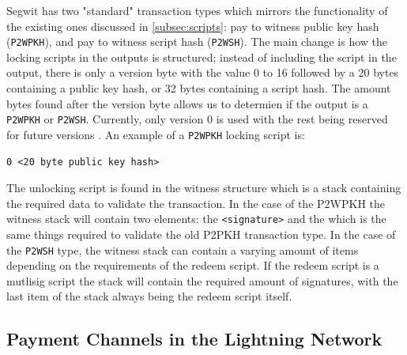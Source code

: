 Segwit has two "standard" transaction types which mirrors the functionality of the existing ones discussed in \cref{subsec:scripts}: pay to witness public key hash ({\tt P2WPKH}), and pay to witness script hash ({\tt P2WSH}). The main change is how the locking scripts in the outputs is structured; instead of including the script in the output, there is only a version byte with the value 0 to 16 followed by a 20 bytes containing a public key hash, or 32 bytes containing a script hash. The amount bytes found after the version byte allows us to determien if the output is a {\tt P2WPKH} or {\tt P2WSH}. Currently, only version 0 is used with the rest being reserved for future versions \cite{BIP141}. An example of a {\tt P2WPKH} locking script is:

\begin{verbatim}
0 <20 byte public key hash>
\end{verbatim}

The unlocking script is found in the witness structure which is a stack containing the required data to validate the transaction.
In the case of the P2WPKH the witness stack will contain two elements: the {\tt <signature>} and the {\tt <public key>} which is the same things required to validate the old P2PKH transaction type. In the case of the {\tt P2WSH} type, the witness stack can contain a varying amount of items depending on the requirements of the redeem script. If the redeem script is a mutlisig script the stack will contain the required amount of signatures, with the last item of the stack always being the redeem script itself.

\subsection{Payment Channels in the Lightning Network} 
\label{subsec:pcln}


